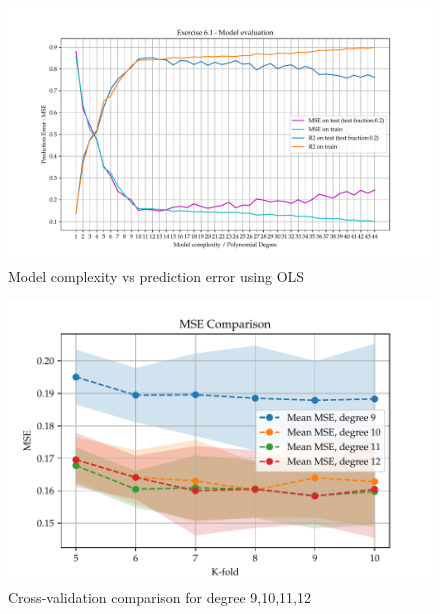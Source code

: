 \documentclass[11pt, a4paper]{article}
\begin{document}
\begin{figure}
  \centering
  \hspace*{-2cm}
  \includegraphics[scale=0.75]{figures/EX6_EX1_OLS_evaluattion.pdf}
  \caption{Model complexity vs prediction error using OLS}
  \label{fig:EX6_1_OLS_fit}
\end{figure}

\begin{figure}
  \centering
  \includegraphics[scale=1.0]{figures/EX6_mse_cv_fold_compare_degrees.pdf}
  \caption{Cross-validation comparison for degree 9,10,11,12}
  \label{fig:EX6_1_CV}
\end{figure}

\end{document}
